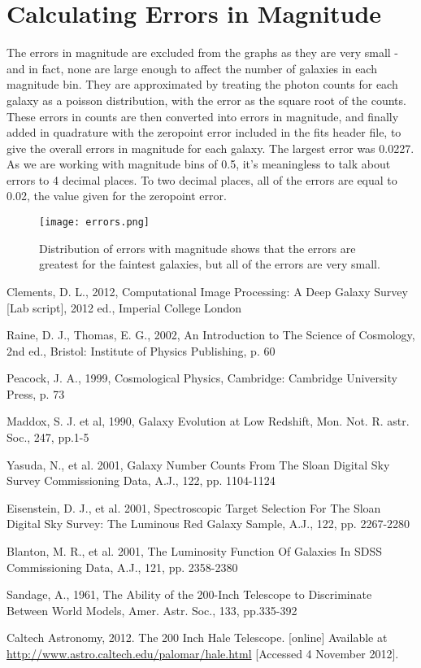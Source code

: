\documentclass[a4paper,11pt,twoside]{article}
\begin{document}
\appendix

\section{Calculating Errors in Magnitude}

The errors in magnitude are excluded from the graphs as they are very small - and in fact, none are large enough to affect the number of galaxies in each magnitude bin. 
They are approximated by treating the photon counts for each galaxy as a poisson distribution, with the error as the square root of the counts. These errors in counts are then converted into errors in magnitude, and finally added in quadrature with the zeropoint error included in the fits header file, to give the overall errors in magnitude for each galaxy. The largest error was 0.0227. As we are working with magnitude bins of 0.5, it's meaningless to talk about errors to 4 decimal places. To two decimal places, all of the errors are equal to 0.02, the value given for the zeropoint error. 

\begin{figure}[htb]
  \centering
  \texttt{[image: errors.png]}
  \caption{Distribution of errors with magnitude shows that the errors are greatest for the faintest galaxies, but all of the errors are very small.}
  \label{fig:varap}
\end{figure}

\begin{thebibliography}{9}

Clements, D. L., 2012, Computational Image Processing: A Deep Galaxy Survey [Lab script], 2012 ed., Imperial College London

Raine, D. J., Thomas, E. G., 2002, An Introduction to The Science of Cosmology, 2nd ed., Bristol: Institute of Physics Publishing, p. 60

Peacock, J. A., 1999, Cosmological Physics, Cambridge: Cambridge University Press, p. 73

Maddox, S. J. et al, 1990, Galaxy Evolution at Low Redshift, Mon. Not. R. astr. Soc., 247, pp.1-5

Yasuda, N., et al. 2001, Galaxy Number Counts From The Sloan Digital Sky Survey Commissioning Data, A.J., 122, pp. 1104-1124

Eisenstein, D. J., et al. 2001, Spectroscopic Target Selection For The Sloan Digital Sky Survey: The Luminous Red Galaxy Sample, A.J., 122, pp. 2267-2280

Blanton, M. R., et al. 2001, The Luminosity Function Of Galaxies In SDSS Commissioning Data, A.J., 121, pp. 2358-2380

Sandage, A., 1961, The Ability of the 200-Inch Telescope to Discriminate Between World Models, Amer. Astr. Soc., 133, pp.335-392

Caltech Astronomy, 2012. The 200 Inch Hale Telescope. [online] Available at \url{http://www.astro.caltech.edu/palomar/hale.html}
[Accessed 4 November 2012].

\end{thebibliography}
\end{document}
